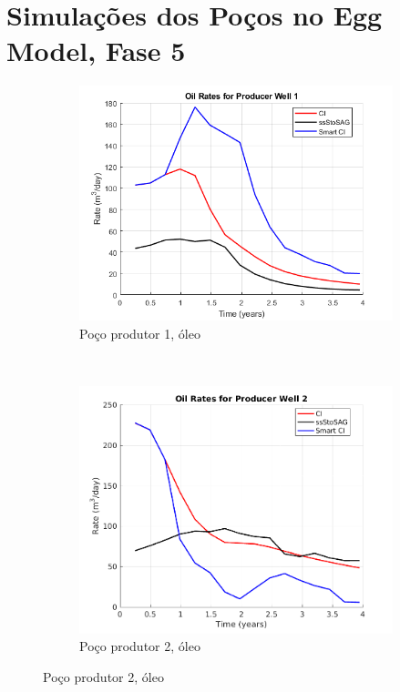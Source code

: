 \chapter{Simula\c{c}\~{o}es dos Po\c{c}os no Egg Model, Fase 5}\label{apn:egg5}

\begin{figure}[!ht]
	\centering
	\begin{subfigure}[b]{.45\textwidth}
		\includegraphics[width=\textwidth]{figs/resultadosEgg/imgsim5/EGG_OilWell1_Zoom}
		\caption{Po\c{c}o produtor 1, \'{o}leo}
		\label{EGG5_OilWell1}
	\end{subfigure}
	~
	\begin{subfigure}[b]{.45\textwidth}
		\includegraphics[width=\textwidth]{figs/resultadosEgg/imgsim5/EGG_OilWell2_Zoom}
		\caption{Po\c{c}o produtor 2, \'{o}leo}
		\label{EGG5_OilWell2}
	\end{subfigure}
	

\end{figure}
